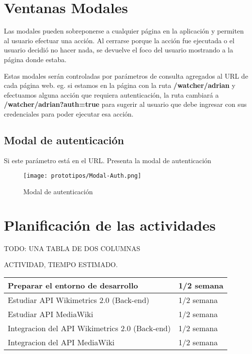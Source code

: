 \section{Ventanas Modales}
Las modales pueden sobreponerse a cualquier página en la aplicación y permiten al usuario efectuar una acción. Al cerrarse porque la acción fue ejecutada o el usuario decidió no hacer nada, se devuelve el foco del usuario mostrando a la página donde estaba.

Estas modales serán controladas por parámetros de consulta agregados al URL de cada página web. eg. si estamos en la página con la ruta \textbf{/watcher/adrian} y efectuamos alguna acción que requiera autenticación, la ruta cambiará a \textbf{/watcher/adrian?auth=true} para sugerir al usuario que debe ingresar con sus credenciales para poder ejecutar esa acción.

\subsection{Modal de autenticación}

Si este parámetro está en el URL. Presenta la modal de autenticación

\begin{figure}[H]
    \centering
    \texttt{[image: prototipos/Modal-Auth.png]}
    \caption{Modal de autenticación}
    \label{ModalAuth}
\end{figure}

\section{Planificación de las actividades}

TODO: UNA TABLA DE DOS COLUMNAS

ACTIVIDAD, TIEMPO ESTIMADO.

\begin{center}
\begin{tabular}{ | m{8cm} | m{5cm} | } 
 \hline
 Preparar el entorno de desarrollo & 1/2 semana \\ 
 \hline
 Estudiar API Wikimetrics 2.0 (Back-end) & 1/2 semana \\ 
 \hline
 Estudiar API MediaWiki & 1/2 semana \\ 
 \hline
 Integracion del API Wikimetrics 2.0 (Back-end) & 1/2 semana \\
 \hline
 Integracion del API MediaWiki & 1/2 semana \\
 \hline
\end{tabular}
\end{center}